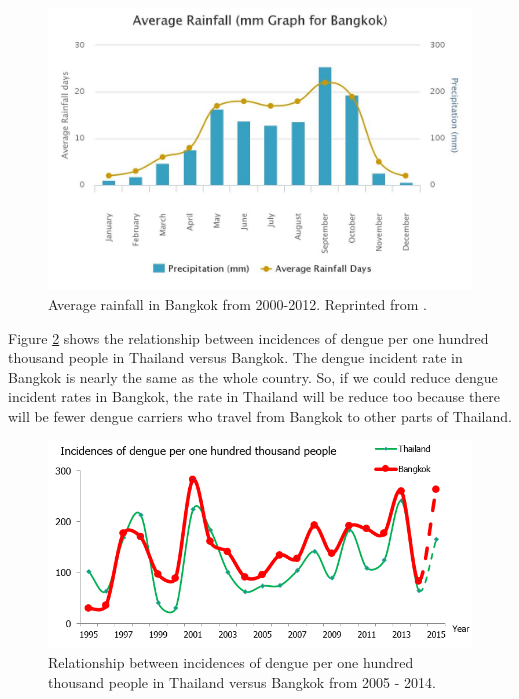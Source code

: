 \documentclass[review]{elsarticle}
\begin{document}
\begin{figure}[htbp]
	\begin{center}
		\includegraphics[width=145mm]{./figures/avg_rain_bangkok}
		\caption{Average rainfall in Bangkok from 2000-2012. Reprinted from \protect\cite{wwo2012}.}
		\label{figure-avg_rain_bangkok}
	\end{center}
\end{figure}

Figure \ref{figure-dengue_incident_rate} shows the relationship between incidences of dengue per one hundred thousand people in Thailand versus Bangkok. The dengue incident rate in Bangkok is nearly the same as the whole country. So, if we could reduce dengue incident rates in Bangkok, the rate in Thailand will be reduce too because there will be fewer dengue carriers who travel from Bangkok to other parts of Thailand.

\begin{figure}[htbp]
	\begin{center}
		\includegraphics[width=140mm]{./figures/dengue_incident_rate}
		\caption{ Relationship between incidences of dengue per one hundred thousand people in Thailand versus Bangkok from 2005 - 2014.}
		\label{figure-dengue_incident_rate}
	\end{center}
\end{figure}
\end{document}
